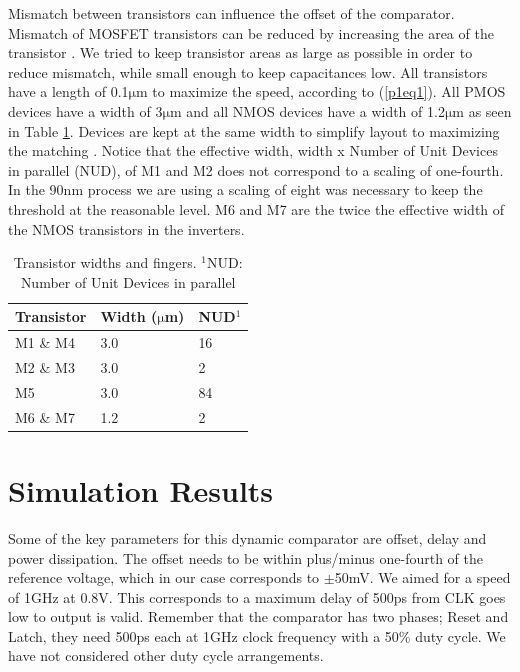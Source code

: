 Mismatch between transistors can influence the offset of the
comparator. Mismatch of MOSFET transistors can be reduced by increasing
the area of the transistor \cite{pelgrom89}. We tried to keep transistor areas as large as possible in order to
reduce mismatch, while small enough to keep capacitances low. All
transistors have a length of 0.1\begin{math}\mathrm{\mu}\end{math}m to
maximize the speed, according to (\ref{p1eq1}). All PMOS devices have a width of
3\begin{math}\mathrm{\mu}\end{math}m and all NMOS devices have a width
of 1.2\begin{math}\mathrm{\mu}\end{math}m as seen in Table \ref{p1tab:p1_widths}. Devices are kept
at the same width to simplify layout to maximizing the matching
\cite{johns}. Notice that the effective width, width x Number of Unit Devices in
parallel (NUD), of M1 and M2 does not correspond to a scaling of
one-fourth.  In the 90nm process we are using a scaling of eight was
necessary to keep the threshold at the reasonable level. M6 and M7 are
the twice the effective width of the NMOS transistors in the inverters.

\begin{table}[htbp]
\centering
\renewcommand{\arraystretch}{1.3}
\caption{ Transistor widths and fingers. $^{1}$NUD:  Number of Unit Devices in parallel }
\label{p1tab:p1_widths}
\begin{tabular}{l|l|l}
\hline
\textbf{Transistor}&\textbf{Width (\begin{math}\mathrm{\mu}\end{math}m)}&\textbf{NUD$^{1}$} \\
\hline
M1 \& M4 & 3.0
&
16
 \\
\hline
M2 \& M3
&
3.0
&
2
 \\
\hline

M5
&
3.0
&
84
 \\
\hline
M6 \& M7
&
1.2
&
2
 \\
\hline
\end{tabular} 
\end{table}

 

\section{Simulation Results}

Some of the key parameters for this dynamic comparator are offset,
delay and power dissipation. The offset needs to be within plus/minus
one-fourth of the reference voltage, which in our case corresponds to
\begin{math}\pm{}\end{math}50mV. We aimed for a speed of 1GHz at 0.8V.
This corresponds to a maximum delay of 500ps from CLK goes low to
output is valid. Remember that the comparator has two phases; Reset and
Latch, they need 500ps each at 1GHz clock frequency with a 50\% duty
cycle. We have not considered other duty cycle arrangements.

